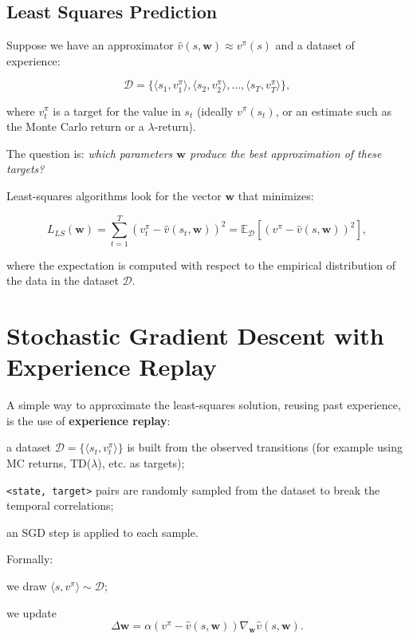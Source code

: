 \subsection{Least Squares Prediction}

Suppose we have an approximator $ \hat{v}(s,\mathbf{w}) \approx v^\pi(s)$ and a dataset of experience:

\[
\mathcal{D} = \{ \langle s_1, v_1^\pi \rangle, \langle s_2, v_2^\pi \rangle, \dots, \langle s_T, v_T^\pi \rangle \},
\]

where $v_t^\pi$ is a target for the value in $s_t$ (ideally $v^\pi(s_t)$, or an estimate such as the Monte Carlo return or a $\lambda$-return).

The question is: \textit{which parameters $\mathbf{w}$ produce the best approximation of these targets?}

Least-squares algorithms look for the vector $\mathbf{w}$ that minimizes:

\[
L_{LS}(\mathbf{w})
=
\sum_{t=1}^{T} \left( v_t^\pi - \hat{v}(s_t,\mathbf{w}) \right)^2
=
\mathbb{E}_{\mathcal{D}} \left[ \left( v^\pi - \hat{v}(s,\mathbf{w}) \right)^2 \right],
\]

where the expectation is computed with respect to the empirical distribution of the data in the dataset $\mathcal{D}$.

\section{Stochastic Gradient Descent with Experience Replay}

A simple way to approximate the least-squares solution, reusing past experience, is the use of \textbf{experience replay}:

\begin{compactitemize}
    \item a dataset $\mathcal{D} = \{ \langle s_t, v_t^\pi \rangle \}$ is built from the observed transitions (for example using MC returns, TD($\lambda$), etc. as targets);
    \item \texttt{<state, target>} pairs are randomly sampled from the dataset to break the temporal correlations;
    \item an SGD step is applied to each sample.
\end{compactitemize}

Formally:

\begin{compactitemize}
    \item we draw $\langle s, v^\pi \rangle \sim \mathcal{D}$;
    \item we update
    \[
    \Delta \mathbf{w}
    =
    \alpha \left( v^\pi - \hat{v}(s,\mathbf{w}) \right)
    \nabla_{\mathbf{w}} \hat{v}(s,\mathbf{w}).
    \]
\end{compactitemize}

